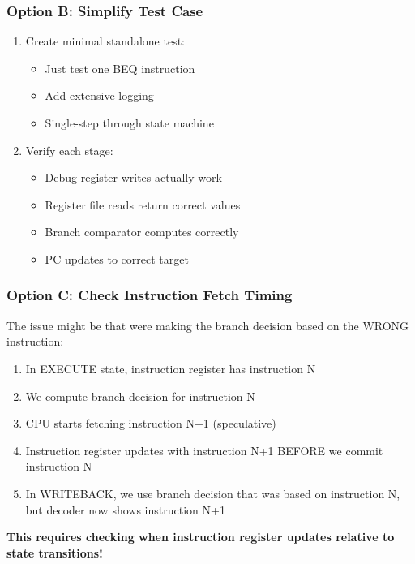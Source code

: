 \subsubsection{Option B: Simplify Test Case}\label{cr:fix:rtl-debug-report:option-b-simplify-test-case}

\begin{record}

\begin{enumerate}
\def\labelenumi{\arabic{enumi}.}
\tightlist
\item
  Create minimal standalone test:

  \begin{itemize}
  \tightlist
  \item
    Just test one BEQ instruction
  \item
    Add extensive logging
  \item
    Single-step through state machine
  \end{itemize}
\item
  Verify each stage:

  \begin{itemize}
  \tightlist
  \item
    Debug register writes actually work
  \item
    Register file reads return correct values
  \item
    Branch comparator computes correctly
  \item
    PC updates to correct target
  \end{itemize}
\end{enumerate}

\end{record}

\subsubsection{Option C: Check Instruction Fetch Timing}\label{cr:fix:rtl-debug-report:option-c-check-instruction-fetch-timing}

\begin{record}

The issue might be that we\textquotesingle re making the branch decision
based on the WRONG instruction:

\begin{enumerate}
\def\labelenumi{\arabic{enumi}.}
\tightlist
\item
  In EXECUTE state, instruction register has instruction N
\item
  We compute branch decision for instruction N
\item
  CPU starts fetching instruction N+1 (speculative)
\item
  Instruction register updates with instruction N+1 BEFORE we commit
  instruction N
\item
  In WRITEBACK, we use branch decision that was based on instruction N,
  but decoder now shows instruction N+1
\end{enumerate}

\textbf{This requires checking when instruction register updates
relative to state transitions!}

\end{record}

